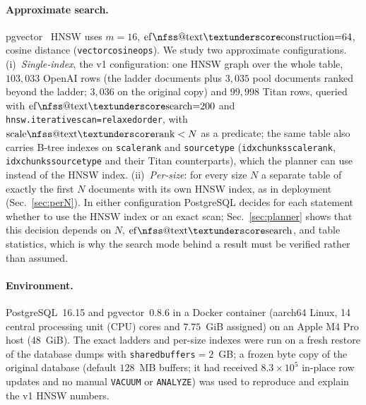 \documentclass{ieeeaccess}
\makeatletter
\DeclareRobustCommand{\_}{\ifmmode\nfss@text{\textunderscore}\else\textunderscore\allowbreak\fi}
\makeatother
\begin{document}
\paragraph{Approximate search.}
pgvector~\cite{pgvector} HNSW uses $m{=}16$, $\mathrm{ef\_construction}{=}64$, cosine distance (\texttt{vector\_cosine\_ops}). We study two approximate configurations. (i)~\emph{Single-index}, the v1 configuration: one HNSW graph over the whole table, $103{,}033$ OpenAI rows (the ladder documents plus $3{,}035$ pool documents ranked beyond the ladder; $3{,}036$ on the original copy) and $99{,}998$ Titan rows, queried with $\mathrm{ef\_search}{=}200$ and \texttt{hnsw.iterative\_scan=relaxed\_order}, with $\mathrm{scale\_rank}<N$ as a predicate; the same table also carries B-tree indexes on \texttt{scale\_rank} and \texttt{source\_type} (\texttt{idx\_chunks\_scale\_rank}, \texttt{idx\_chunks\_source\_type} and their Titan counterparts), which the planner can use instead of the HNSW index. (ii)~\emph{Per-size}: for every size $N$ a separate table of exactly the first $N$ documents with its own HNSW index, as in deployment (Sec.~\ref{sec:perN}). In either configuration PostgreSQL decides for each statement whether to use the HNSW index or an exact scan; Sec.~\ref{sec:planner} shows that this decision depends on $N$, $\mathrm{ef\_search}$, and table statistics, which is why the search mode behind a result must be verified rather than assumed.

\paragraph{Environment.}
PostgreSQL~16.15 and pgvector~0.8.6 in a Docker container (aarch64 Linux, 14 central processing unit (CPU) cores and $7.75$~GiB assigned) on an Apple M4 Pro host (48~GiB). The exact ladders and per-size indexes were run on a fresh restore of the database dumps with \texttt{shared\_buffers}${=}2$~GB; a frozen byte copy of the original database (default $128$~MB buffers; it had received $8.3\times10^5$ in-place row updates and no manual \texttt{VACUUM} or \texttt{ANALYZE}) was used to reproduce and explain the v1 HNSW numbers.
\end{document}
